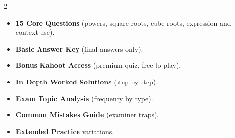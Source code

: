 \documentclass[11pt,a4paper]{article}
\newcommand{\FullReleaseDate}{April 30, 2026}
\begin{document}
\vspace{8pt}

\begin{multicols}{2}
  \begin{tcolorbox}[card, title=\sffamily\bfseries\textcolor{white}{\faHandPointDown\ TODAY (Simplified Version)}, colbacktitle=mainblue, boxed title style={sharp corners, boxrule=0pt}]
    \begin{itemize}[leftmargin=1.2em, itemsep=2pt]
      \item \small \textbf{15 Core Questions} (powers, square roots, cube roots, expression and context use).
      \item \small \textbf{Basic Answer Key} (final answers only).
      \item \small \textbf{Bonus Kahoot Access} (premium quiz, free to play).
    \end{itemize}
  \end{tcolorbox}

  \columnbreak

  \begin{tcolorbox}[card, title=\sffamily\bfseries\textcolor{white}{\faRocket\ ON \FullReleaseDate\ (Full Upgrade)}, colbacktitle=mainblue, boxed title style={sharp corners, boxrule=0pt}]
    \begin{itemize}[leftmargin=1.2em, itemsep=2pt]
      \item \small \textbf{In-Depth Worked Solutions} (step-by-step).
      \item \small \textbf{Exam Topic Analysis} (frequency by type).
      \item \small \textbf{Common Mistakes Guide} (examiner traps).
      \item \small \textbf{Extended Practice} variations.
    \end{itemize}
  \end{tcolorbox}
\end{multicols}
\end{document}
